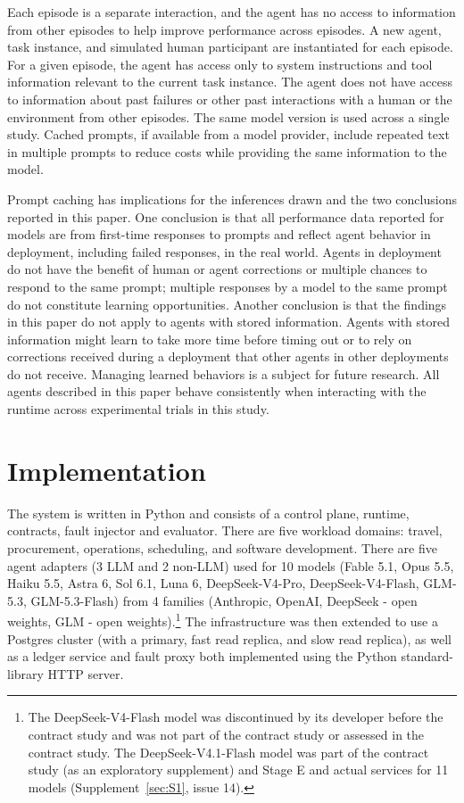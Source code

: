 \documentclass[letterpaper,twocolumn,10pt]{article}
\begin{document}
Each episode is a separate interaction, and the agent has no access to information from other episodes to help improve performance across episodes. A new agent, task instance, and simulated human participant are instantiated for each episode. For a given episode, the agent has access only to system instructions and tool information relevant to the current task instance. The agent does not have access to information about past failures or other past interactions with a human or the environment from other episodes. The same model version is used across a single study. Cached prompts, if available from a model provider, include repeated text in multiple prompts to reduce costs while providing the same information to the model.

Prompt caching has implications for the inferences drawn and the two conclusions reported in this paper. One conclusion is that all performance data reported for models are from first-time responses to prompts and reflect agent behavior in deployment, including failed responses, in the real world. Agents in deployment do not have the benefit of human or agent corrections or multiple chances to respond to the same prompt; multiple responses by a model to the same prompt do not constitute learning opportunities. Another conclusion is that the findings in this paper do not apply to agents with stored information. Agents with stored information might learn to take more time before timing out or to rely on corrections received during a deployment that other agents in other deployments do not receive. Managing learned behaviors is a subject for future research. All agents described in this paper behave consistently when interacting with the runtime across experimental trials in this study.

\section{Implementation}\label{sec:5}

The system is written in Python and consists of a control plane, runtime, contracts, fault injector and evaluator. There are five workload domains: travel, procurement, operations, scheduling, and software development. There are five agent adapters (3 LLM and 2 non-LLM) used for 10 models (Fable 5.1, Opus 5.5, Haiku 5.5, Astra 6, Sol 6.1, Luna 6, DeepSeek-V4-Pro, DeepSeek-V4-Flash, GLM-5.3, GLM-5.3-Flash) from 4 families (Anthropic, OpenAI, DeepSeek - open weights, GLM - open weights).\footnote{The DeepSeek-V4-Flash model was discontinued by its developer before the contract study and was not part of the contract study or assessed in the contract study. The DeepSeek-V4.1-Flash model was part of the contract study (as an exploratory supplement) and Stage E and actual services for 11 models (Supplement~\ref{sec:S1}, issue 14).} The infrastructure was then extended to use a Postgres cluster (with a primary, fast read replica, and slow read replica), as well as a ledger service and fault proxy both implemented using the Python standard-library HTTP server.
\end{document}
